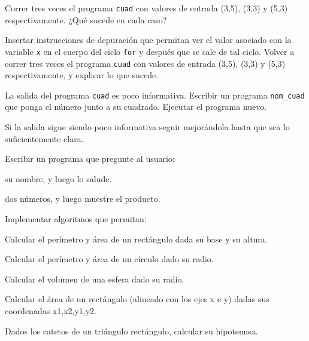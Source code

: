 \begin{ejercicio}
Correr tres veces el programa \lstinline!cuad! con valores
de entrada (3,5), (3,3) y (5,3) respectivamente. ¿Qué sucede en
cada caso?
\end{ejercicio}

\begin{ejercicio}
Insertar instrucciones de depuración que permitan ver el valor
asociado con la variable \lstinline!x! en el cuerpo del ciclo \lstinline!for! y
después que se sale de tal ciclo.  Volver a correr tres veces el programa
\lstinline!cuad! con valores de entrada (3,5), (3,3) y (5,3) respectivamente, y
explicar lo que sucede.
\end{ejercicio}

\begin{ejercicio}
La salida del programa \lstinline!cuad! es poco
informativa. Escribir un programa \lstinline!nom_cuad! que ponga el
número junto a su cuadrado. Ejecutar el programa nuevo.
\end{ejercicio}

\begin{ejercicio}
Si la salida sigue siendo poco informativa seguir mejorándola hasta
que sea lo suficientemente clara.
\end{ejercicio}

\begin{ejercicio}
Escribir un programa que pregunte al usuario:
\begin{partes}
  \item su nombre, y luego lo salude.
  \item dos números, y luego muestre el producto.
\end{partes}
\end{ejercicio}

\begin{ejercicio} Implementar algoritmos que permitan:
\begin{partes}
 \item Calcular el perímetro y área de un rectángulo dada su base y su altura.
 \item Calcular el perímetro y área de un círculo dado su radio.
 \item Calcular el volumen de una esfera dado su radio.
 \item Calcular el área de un rectángulo (alineado con los ejes x e y) dadas sus coordenadas x1,x2,y1,y2.
 \item Dados los catetos de un triángulo rectángulo, calcular su hipotenusa.
\end{partes}
\end{ejercicio}

